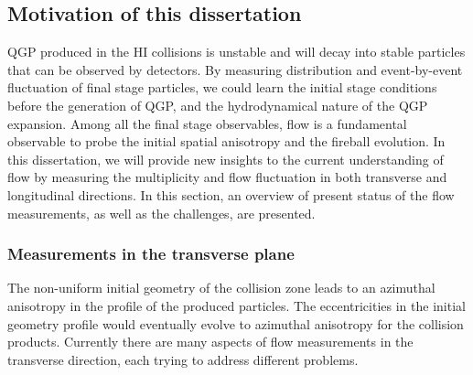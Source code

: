 \subsection{Motivation of this dissertation}

QGP produced in the HI collisions is unstable and will decay into stable particles that can be observed by detectors. By measuring distribution and event-by-event fluctuation of final stage particles, we could learn the initial stage conditions before the generation of QGP, and the hydrodynamical nature of the QGP expansion. Among all the final stage observables, flow is a fundamental observable to probe the initial spatial anisotropy and the fireball evolution. In this dissertation, we will provide new insights to the current understanding of flow by measuring the multiplicity and flow fluctuation in both transverse and longitudinal directions. In this section, an overview of present status of the flow measurements, as well as the challenges, are presented.



\subsubsection{Measurements in the transverse plane}
\label{sec:transverse_measurements}

The non-uniform initial geometry of the collision zone leads to an azimuthal anisotropy in the profile of the produced particles. The eccentricities in the initial geometry profile would eventually evolve to azimuthal anisotropy for the collision products. Currently there are many aspects of flow measurements in the transverse direction, each trying to address different problems.

